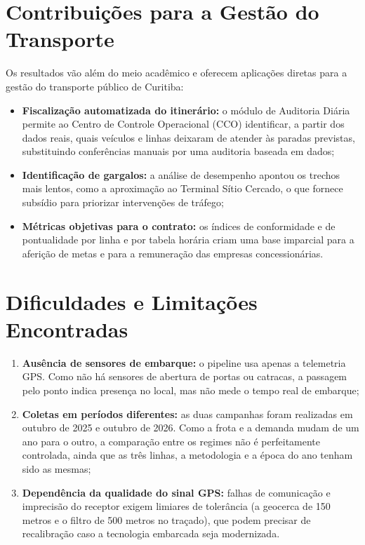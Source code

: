 \section{Contribuições para a Gestão do Transporte}\label{sec:contribuicoes}

Os resultados vão além do meio acadêmico e oferecem aplicações diretas para a gestão do transporte público de Curitiba:

\begin{itemize}
  \item \textbf{Fiscalização automatizada do itinerário:} o módulo de Auditoria Diária permite ao Centro de Controle Operacional (CCO) identificar, a partir dos dados reais, quais veículos e linhas deixaram de atender às paradas previstas, substituindo conferências manuais por uma auditoria baseada em dados;
  \item \textbf{Identificação de gargalos:} a análise de desempenho apontou os trechos mais lentos, como a aproximação ao Terminal Sítio Cercado, o que fornece subsídio para priorizar intervenções de tráfego;
  \item \textbf{Métricas objetivas para o contrato:} os índices de conformidade e de pontualidade por linha e por tabela horária criam uma base imparcial para a aferição de metas e para a remuneração das empresas concessionárias.
\end{itemize}

\section{Dificuldades e Limitações Encontradas}\label{sec:limitacoes}

\begin{enumerate}
  \item \textbf{Ausência de sensores de embarque:} o pipeline usa apenas a telemetria GPS. Como não há sensores de abertura de portas ou catracas, a passagem pelo ponto indica presença no local, mas não mede o tempo real de embarque;
  \item \textbf{Coletas em períodos diferentes:} as duas campanhas foram realizadas em outubro de 2025 e outubro de 2026. Como a frota e a demanda mudam de um ano para o outro, a comparação entre os regimes não é perfeitamente controlada, ainda que as três linhas, a metodologia e a época do ano tenham sido as mesmas;
  \item \textbf{Dependência da qualidade do sinal GPS:} falhas de comunicação e imprecisão do receptor exigem limiares de tolerância (a geocerca de 150 metros e o filtro de 500 metros no traçado), que podem precisar de recalibração caso a tecnologia embarcada seja modernizada.
\end{enumerate}

